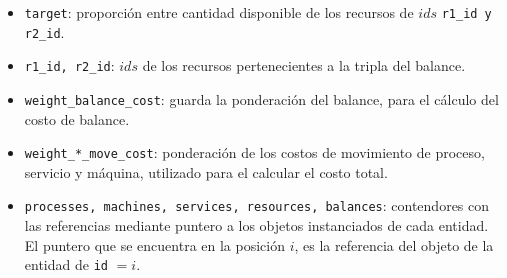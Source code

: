 \documentclass[../informe2.tex]{subfiles}
\begin{document}
\noindent\begin{minipage}{0.5\textwidth}
	\small
	\begin{itemize}[leftmargin=*]
		\item \texttt{target}: proporción entre cantidad disponible de los recursos de $ids$ \texttt{r1\_id y r2\_id}.
		\item \texttt{r1\_id, r2\_id}: $ids$ de los recursos pertenecientes a la tripla del balance.
		\item \texttt{weight\_balance\_cost}: guarda la ponderación del balance, para el cálculo del costo de balance.
	\end{itemize}
\end{minipage}\hfill
\begin{minipage}{0.4\textwidth}
\end{minipage}

\vspace{1cm}

\noindent\begin{minipage}{0.35\textwidth}
\end{minipage}\hfill
\begin{minipage}{0.55\textwidth}
	\small
	\begin{itemize}[leftmargin=*]
		\item \texttt{weight\_*\_move\_cost}: ponderación de los costos de movimiento de proceso, servicio y máquina, utilizado para el calcular el costo total.
		\item \texttt{processes, machines, services, resources, balances}: contendores con las referencias mediante puntero a los objetos instanciados de cada entidad. El puntero que se encuentra en la posición $i$, es la referencia del objeto de la entidad de \texttt{id} $=i$.
	\end{itemize}
\end{minipage}
\end{document}
